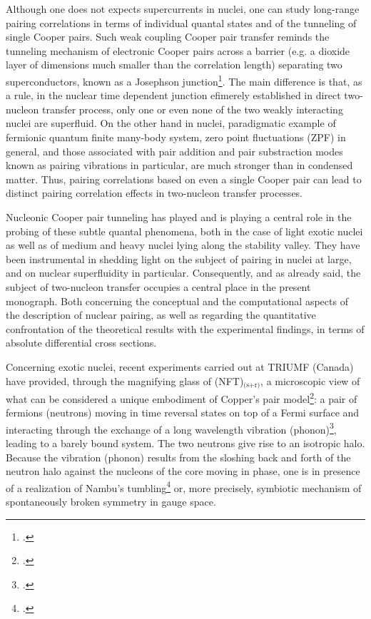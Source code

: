  
  Although one does not expects supercurrents in nuclei, one can study long-range pairing correlations in terms of individual quantal states and of the tunneling of single Cooper pairs. Such weak coupling Cooper pair transfer reminds  the tunneling mechanism of electronic Cooper pairs across a barrier (e.g. a dioxide layer of dimensions much smaller than the correlation length) separating two superconductors, known as a Josephson junction\footnote{\cite{Josephson:62,Anderson:64b}.}. The main difference is that, as a rule, in the nuclear time dependent junction efimerely established in  direct two-nucleon transfer process, only one or even none of the two weakly interacting nuclei are superfluid. 
  On the other hand in nuclei, paradigmatic example of fermionic quantum  finite many-body system, zero point fluctuations  (ZPF) in general, and those associated with pair addition and pair substraction modes known as pairing vibrations in particular, are much stronger than in condensed matter. Thus, pairing correlations based on even  a single Cooper pair can lead to distinct pairing correlation effects in two-nucleon transfer processes. 
  
  
 Nucleonic Cooper pair tunneling has played and is playing a central role in the probing of these subtle quantal phenomena, both in the case of  light exotic nuclei as well as of medium and heavy nuclei lying along the stability valley. They  have been instrumental in shedding light on the subject of pairing in nuclei at large, and on nuclear superfluidity in particular. Consequently, and as already said, the subject of two-nucleon transfer occupies  a central place in the present monograph. Both concerning the conceptual and the computational aspects of the description of nuclear pairing, as well as regarding the quantitative confrontation of the theoretical  results  with the experimental findings, in terms of absolute differential cross sections.

Concerning exotic nuclei, recent experiments carried out at TRIUMF (Canada) have provided, through the magnifying glass of (NFT)$_\text{(s+r)}$, a microscopic view of what can be considered a unique embodiment of Copper's pair model\footnote{\cite{Cooper:56}.}: a pair of fermions (neutrons) moving in time reversal states on top of a  Fermi surface and interacting through the exchange of a long wavelength vibration (phonon)\footnote{\cite{Frohlich:52,Bardeen:55,Bardeen:57a,Bardeen:57b}.}, leading to a barely bound system. The two neutrons give rise to an isotropic halo. Because the vibration (phonon) results from the sloshing back and forth of the neutron halo against the  nucleons of the core moving in phase, one is in presence of a realization of Nambu's tumbling\footnote{\cite{Nambu:91}.} or, more precisely, symbiotic mechanism of spontaneously broken symmetry in gauge space.

